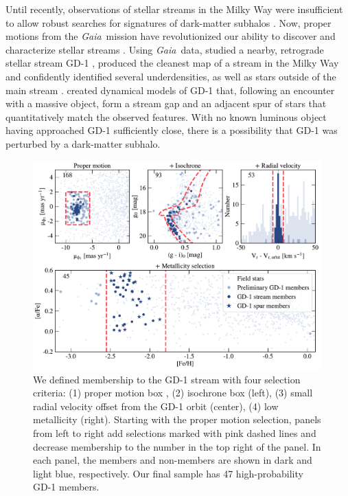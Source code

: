 \documentclass[twocolumn]{aastex63}
\newcommand{\gaia}{\textsl{Gaia}}
\begin{document}
Until recently, observations of stellar streams in the Milky Way were insufficient to allow robust searches for signatures of dark-matter subhalos \citep[cf.][]{carlberg2012, ibata2016}.
Now, proper motions from the \gaia\ mission \citep{gdr2} have revolutionized our ability to discover \citep[e.g.,][]{malhan2018,meingast2019} and characterize stellar streams \citep[e.g.,][]{bonaca2019b,shipp2019}.
Using \gaia\ data, \citet{pwb} studied a nearby, retrograde stellar stream GD-1 \citep{grillmair2006}, produced the cleanest map of a stream in the Milky Way and confidently identified several underdensities, as well as stars outside of the main stream \citep[see also][]{malhan2019b, deboer2019}.
\citet{bonaca2019a} created dynamical models of GD-1 that, following an encounter with a massive object, form a stream gap and an adjacent spur of stars that  quantitatively match the observed features.
With no known luminous object having approached GD-1 sufficiently close, there is a possibility that GD-1 was perturbed by a dark-matter subhalo.

\begin{figure}
\begin{center}
\includegraphics[width=0.99\textwidth]{members.pdf}
\end{center}
\caption{We defined membership to the GD-1 stream with four selection criteria: (1) proper motion box \citep[from][not shown]{pwb}, (2) isochrone box (left), (3) small radial velocity offset from the GD-1 orbit (center), (4) low metallicity (right).
Starting with the proper motion selection, panels from left to right add selections marked with pink dashed lines and decrease membership to the number in the top right of the panel.
In each panel, the members and non-members are shown in dark and light blue, respectively.
Our final sample has 47 high-probability GD-1 members.
}
\label{fig:members}
\end{figure}
\end{document}
